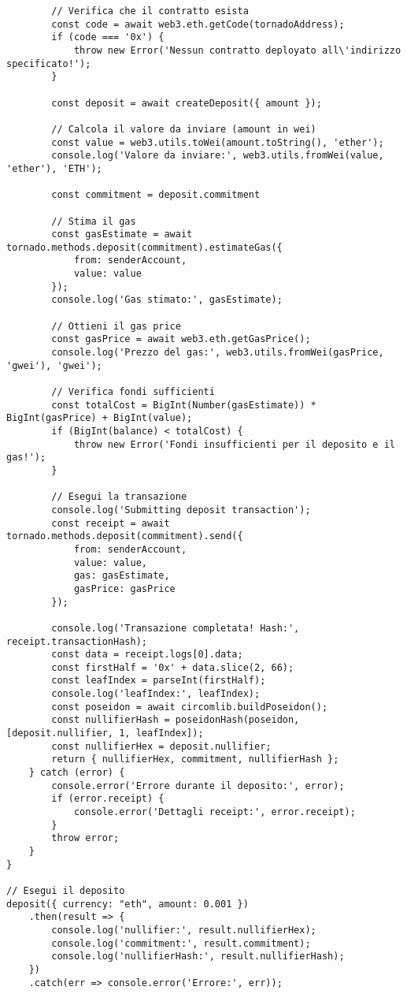 \begin{lstlisting}
        // Verifica che il contratto esista
        const code = await web3.eth.getCode(tornadoAddress);
        if (code === '0x') {
            throw new Error('Nessun contratto deployato all\'indirizzo specificato!');
        }

        const deposit = await createDeposit({ amount });

        // Calcola il valore da inviare (amount in wei)
        const value = web3.utils.toWei(amount.toString(), 'ether');
        console.log('Valore da inviare:', web3.utils.fromWei(value, 'ether'), 'ETH');

        const commitment = deposit.commitment

        // Stima il gas
        const gasEstimate = await tornado.methods.deposit(commitment).estimateGas({
            from: senderAccount,
            value: value
        });
        console.log('Gas stimato:', gasEstimate);

        // Ottieni il gas price
        const gasPrice = await web3.eth.getGasPrice();
        console.log('Prezzo del gas:', web3.utils.fromWei(gasPrice, 'gwei'), 'gwei');

        // Verifica fondi sufficienti
        const totalCost = BigInt(Number(gasEstimate)) * BigInt(gasPrice) + BigInt(value);
        if (BigInt(balance) < totalCost) {
            throw new Error('Fondi insufficienti per il deposito e il gas!');
        }

        // Esegui la transazione
        console.log('Submitting deposit transaction');
        const receipt = await tornado.methods.deposit(commitment).send({
            from: senderAccount,
            value: value,
            gas: gasEstimate,
            gasPrice: gasPrice
        });

        console.log('Transazione completata! Hash:', receipt.transactionHash);
        const data = receipt.logs[0].data;
        const firstHalf = '0x' + data.slice(2, 66);
        const leafIndex = parseInt(firstHalf);
        console.log('leafIndex:', leafIndex);
        const poseidon = await circomlib.buildPoseidon();
        const nullifierHash = poseidonHash(poseidon, [deposit.nullifier, 1, leafIndex]);
        const nullifierHex = deposit.nullifier;
        return { nullifierHex, commitment, nullifierHash };
    } catch (error) {
        console.error('Errore durante il deposito:', error);
        if (error.receipt) {
            console.error('Dettagli receipt:', error.receipt);
        }
        throw error;
    }
}

// Esegui il deposito
deposit({ currency: "eth", amount: 0.001 })
    .then(result => {
        console.log('nullifier:', result.nullifierHex);
        console.log('commitment:', result.commitment);
        console.log('nullifierHash:', result.nullifierHash);
    })
    .catch(err => console.error('Errore:', err));
\end{lstlisting}

